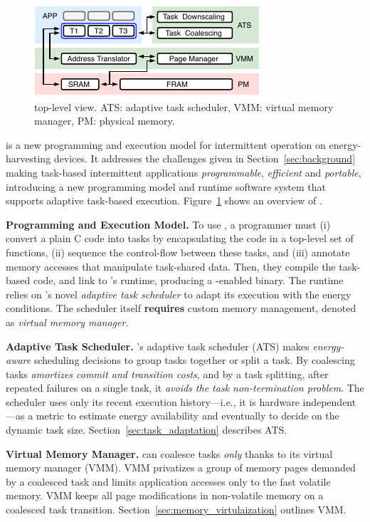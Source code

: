 \begin{figure}
	\centering
	\includegraphics[width=\columnwidth]{figures/system-overview.pdf}
	\caption{\sys top-level view. ATS: adaptive task scheduler, VMM: virtual memory manager, PM: physical memory.}
	\label{fig:system_overview}
\end{figure}

\sys is a new programming and execution model for intermittent operation on energy-harvesting devices. It addresses the challenges given in Section~\ref{sec:background} making task-based intermittent applications {\em programmable}, {\em efficient} and {\em portable}, introducing a new programming model and runtime software system that supports adaptive task-based execution. Figure~\ref{fig:system_overview} shows an overview of \sys.

\textbf{Programming and Execution Model.}  To use \sys, a programmer must (i) convert a plain C code into tasks by encapsulating the code in a top-level set of functions, (ii) sequence the control-flow between these tasks, and (iii) annotate memory accesses that manipulate task-shared data. Then, they compile the task-based code, and link to \sys's runtime, producing a \sys-enabled binary. The runtime relies on \sys's novel {\em adaptive task scheduler} to adapt its execution with the energy conditions. The scheduler itself \textbf{requires} custom memory management, denoted as {\em virtual memory manager}.

\textbf{Adaptive Task Scheduler.} \sys's adaptive task scheduler (ATS) makes \emph{energy-aware} scheduling decisions to group tasks together or split a task. By coalescing tasks \sys \emph{amortizes commit and transition costs}, and by a task splitting, after repeated failures on a single task, it \emph{avoids the task non-termination problem}. The scheduler uses only its recent execution history---i.e., it is hardware independent---as a metric to estimate energy availability and eventually to decide on the dynamic task size. Section~\ref{sec:task_adaptation} describes ATS.

\textbf{Virtual Memory Manager.} \sys can coalesce tasks \emph{only} thanks to its virtual memory manager (VMM). VMM privatizes a group of memory pages demanded by a coalesced task and limits application accesses only to the fast volatile memory. VMM keeps all page modifications in non-volatile memory on a coalesced task transition. Section~\ref{sec:memory_virtulaization} outlines VMM.
